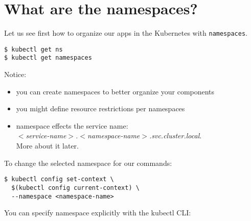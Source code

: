 \documentclass[12pt, letterpaper]{article}
\begin{document}
\begin{figure}[ht]
\centering
{}
\end{figure}



\section{What are the namespaces?}
Let us see first how to organize our apps in the Kubernetes with \verb|namespaces|.

\begin{verbatim}
$ kubectl get ns
$ kubectl get namespaces
\end{verbatim}

Notice:
\begin{itemize}
    \item you can create namespaces to better organize your components
    \item you might define resource restrictions per namespaces
    \item namespace effects the service name:\\ \textit{$<$service-name$>$.$<$namespace-name$>$.svc.cluster.local}.\\%
    More about it later.
\end{itemize}

To change the selected namespace for our commands:

\begin{verbatim}
$ kubectl config set-context \
  $(kubectl config current-context) \
  --namespace <namespace-name>
\end{verbatim}

You can specify namespace explicitly with the kubectl {\small CLI}:
\end{document}
